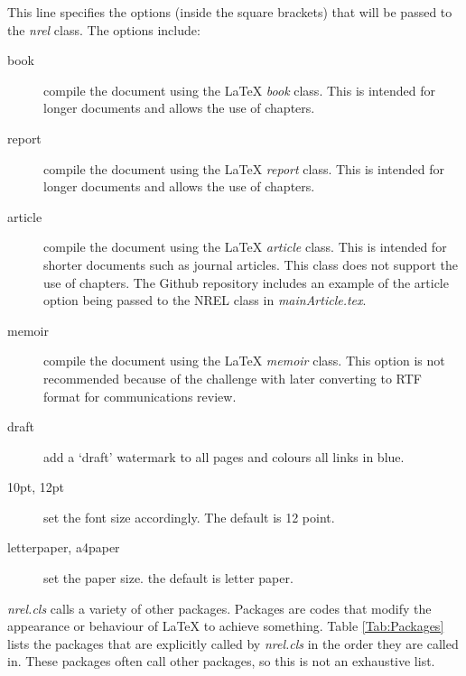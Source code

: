 This line specifies the options (inside the square brackets) that will be passed to the \emph{nrel} class. The options include:
\begin{description}
\item[book]{compile the document using the LaTeX \emph{book} class. This is intended for longer documents and allows the use of chapters.}
\item[report]{compile the document using the LaTeX \emph{report} class. This is intended for longer documents and allows the use of chapters.}
\item[article]{compile the document using the LaTeX \emph{article} class. This is intended for shorter documents such as journal articles. This class does not support the use of chapters. The Github repository includes an example of the article option being passed to the NREL class in \emph{mainArticle.tex}.}
\item[memoir]{compile the document using the LaTeX \emph{memoir} class. This option is not recommended because of the challenge with later converting to RTF format for communications review.}
\item[draft]{add a `draft' watermark to all pages and colours all links in blue.}
\item[10pt, 12pt]{set the font size accordingly. The default is 12 point.}
\item[letterpaper, a4paper]{set the paper size. the default is letter paper.}
\end{description}

\emph{nrel.cls} calls a variety of other packages. Packages are codes that modify the appearance or behaviour of LaTeX to achieve something. Table \ref{Tab:Packages} lists the packages that are explicitly called by \emph{nrel.cls} in the order they are called in. These packages often call other packages, so this is not an exhaustive list.

